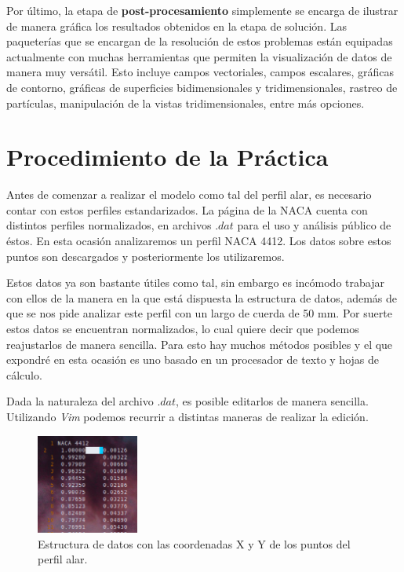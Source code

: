 \documentclass[12pt, letterpaper]{article}
\begin{document}
Por último, la etapa de \textbf{post-procesamiento} simplemente se encarga de ilustrar de manera gráfica los resultados obtenidos en la etapa de solución. Las paqueterías que se encargan de la resolución de estos problemas están equipadas actualmente con muchas herramientas que permiten la visualización de datos de manera muy versátil. Esto incluye campos vectoriales, campos escalares, gráficas de contorno, gráficas de superficies bidimensionales y tridimensionales, rastreo de partículas, manipulación de la vistas tridimensionales, entre más opciones.

\section*{Procedimiento de la Práctica}

Antes de comenzar a realizar el modelo como tal del perfil alar, es necesario contar con estos perfiles estandarizados. La página de la NACA cuenta con distintos perfiles normalizados, en archivos $.dat$ para el uso y análisis público de éstos. En esta ocasión analizaremos un perfil NACA 4412. Los datos sobre estos puntos son descargados y posteriormente los utilizaremos.

Estos datos ya son bastante útiles como tal, sin embargo es incómodo trabajar con ellos de la manera en la que está dispuesta la estructura de datos, además de que se nos pide analizar este perfil con un largo de cuerda de 50 mm. Por suerte estos datos se encuentran normalizados, lo cual quiere decir que podemos reajustarlos de manera sencilla. Para esto hay muchos métodos posibles y el que expondré en esta ocasión es uno basado en un procesador de texto y hojas de cálculo. 

Dada la naturaleza del archivo $.dat$, es posible editarlos de manera sencilla. Utilizando \textit{Vim} podemos recurrir a distintas maneras de realizar la edición.

\begin{figure}[H]
	\centering
	\includegraphics[width=0.3\textwidth]{01.png}
	\caption{Estructura de datos con las coordenadas X y Y de los puntos del perfil alar.}
\end{figure}
\end{document}
